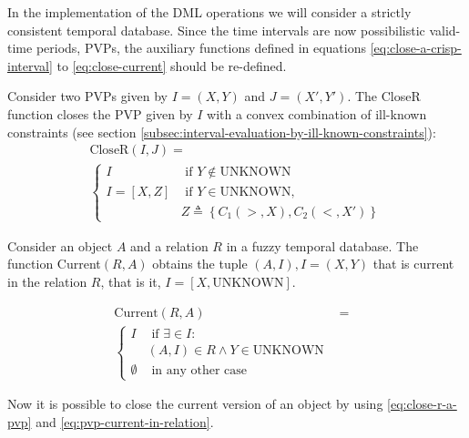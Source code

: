 In the implementation of the DML operations we will consider a strictly consistent temporal database. Since the time intervals are now possibilistic valid-time periods, PVPs, the auxiliary functions defined in equations \eqref{eq:close-a-crisp-interval} to \eqref{eq:close-current} should be re-defined.

\begin{definition}
\label{def:close-r-a-pvp}
Consider two PVPs given by $I = \left(X, Y \right)$ and $J = \left(X', Y' \right)$. The CloseR function closes the PVP given by $I$ with a convex combination of ill-known constraints (see section \ref{subsec:interval-evaluation-by-ill-known-constraints}):
\begin{align}
\label{eq:close-r-a-pvp}
\text{CloseR}\left(I, J\right) = \\
\begin{cases}
\nonumber
I   & \mbox{ if } Y \not \in \text{UNKNOWN}  \\
I = \left[X, Z \right] & \mbox{ if } Y \in \text{UNKNOWN}, \\
& Z \triangleq \left \lbrace C_1\left(>, X \right), C_2\left(<, X' \right) \right \rbrace
\end{cases}
\end{align}
\end{definition}

\begin{definition}
\label{def:pvp-current-in-relation}
Consider an object $A$ and a relation $R$ in a fuzzy temporal database. The function Current$\left(R, A \right)$ obtains the tuple $\left(A, I \right), I = \left(X, Y \right)$ that is current in the relation $R$, that is it, $I = \left[X , \text{UNKNOWN} \right]$.

\begin{align}
\label{eq:pvp-current-in-relation}
\mbox{Current} \left(R, A \right) &=& \\ 
\begin{cases}
\nonumber
I & \mbox{ if } \exists  \in I : \\
&  (A,I) \in R \wedge Y \in \text{UNKNOWN}\\
\emptyset & \mbox{ in any other case }
\end{cases}
\end{align}
\end{definition}

Now it is possible to close the current version of an object by using \eqref{eq:close-r-a-pvp} and \eqref{eq:pvp-current-in-relation}.

